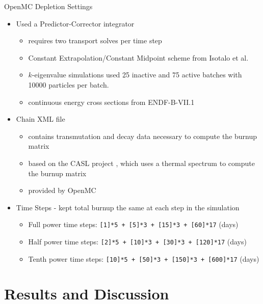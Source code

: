 \documentclass[9pt,t,aspectratio=169]{beamer}
\begin{document}
\begin{frame}{OpenMC Depletion Settings}
    \begin{itemize}
        \item Used a Predictor-Corrector integrator
        \begin{itemize}
            \item requires two transport solves per time step
            \item Constant Extrapolation/Constant Midpoint scheme from Isotalo et al. \cite{isotalo_comparison_2015}
            \item $k$-eigenvalue simulations used 25 inactive and 75 active batches with 10000 particles per batch.
            \item continuous energy cross sections from ENDF-B-VII.1
        \end{itemize}
        \item Chain XML file
        \begin{itemize}
            \item contains transmutation and decay data necessary to compute the burnup matrix
            \item based on the CASL project \cite{CASL-report}, which uses a thermal spectrum to compute the burnup matrix
            \item provided by OpenMC \cite{openmc-chains}
        \end{itemize}
        \item Time Steps - kept total burnup the same at each step in the simulation
        \begin{itemize}
            \item Full power time steps: \texttt{[1]*5 + [5]*3 + [15]*3 + [60]*17} (days)
            \item Half power time steps: \texttt{[2]*5 + [10]*3 + [30]*3 + [120]*17} (days)
            \item Tenth power time steps: \texttt{[10]*5 + [50]*3 + [150]*3 + [600]*17} (days)
        \end{itemize}
    \end{itemize}
\end{frame}
\section{Results and Discussion}
\end{document}

